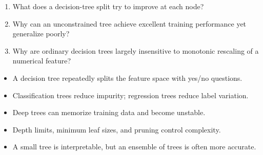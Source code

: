 \begin{quickcheck}
\begin{enumerate}
  \item What does a decision-tree split try to improve at each node?
  \item Why can an unconstrained tree achieve excellent training performance yet generalize poorly?
  \item Why are ordinary decision trees largely insensitive to monotonic rescaling of a numerical feature?
\end{enumerate}
\end{quickcheck}

\begin{chapterrecap}
\begin{itemize}
  \item A decision tree repeatedly splits the feature space with yes/no questions.
  \item Classification trees reduce impurity; regression trees reduce label variation.
  \item Deep trees can memorize training data and become unstable.
  \item Depth limits, minimum leaf sizes, and pruning control complexity.
  \item A small tree is interpretable, but an ensemble of trees is often more accurate.
\end{itemize}
\end{chapterrecap}
